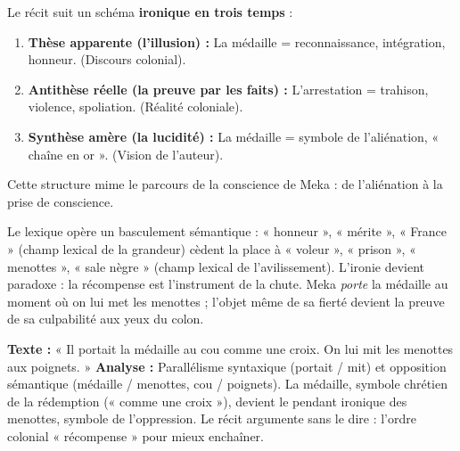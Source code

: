 \documentclass[11pt]{article}
\newcommand{\cle}[1]{{\popxbold\color{popdark}#1}}
\begin{document}
\begin{propriete}
Le récit suit un schéma \textbf{ironique en trois temps} :
\begin{enumerate}
\item \textbf{Thèse apparente (l'illusion) :} La médaille = reconnaissance, intégration, honneur. (Discours colonial).
\item \textbf{Antithèse réelle (la preuve par les faits) :} L'arrestation = trahison, violence, spoliation. (Réalité coloniale).
\item \textbf{Synthèse amère (la lucidité) :} La médaille = symbole de l'aliénation, « chaîne en or ». (Vision de l'auteur).
\end{enumerate}
Cette structure mime le parcours de la conscience de Meka : de l'aliénation à la prise de conscience.
\end{propriete}

Le lexique opère un \cle{basculement sémantique} : « honneur », « mérite », « France » (champ lexical de la grandeur) cèdent la place à « voleur », « prison », « menottes », « sale nègre » (champ lexical de l'avilissement). L'ironie devient \cle{paradoxe} : la récompense est l'instrument de la chute. Meka \emph{porte} la médaille au moment où on lui met les menottes ; l'objet même de sa fierté devient la preuve de sa culpabilité aux yeux du colon.

\begin{exemplebox}
\textbf{Texte :} « Il portait la médaille au cou comme une croix. On lui mit les menottes aux poignets. »
\textbf{Analyse :} Parallélisme syntaxique (portait / mit) et opposition sémantique (médaille / menottes, cou / poignets). La médaille, symbole chrétien de la rédemption (« comme une croix »), devient le pendant ironique des menottes, symbole de l'oppression. Le récit argumente sans le dire : l'ordre colonial « récompense » pour mieux enchaîner.
\end{exemplebox}
\end{document}
